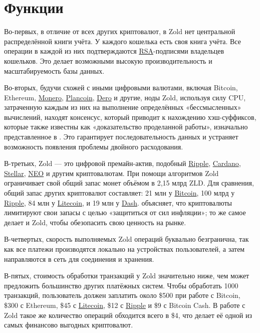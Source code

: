 \documentclass[12pt,oneside]{article}
\begin{document}
\pagebreak

\section*{Функции}

Во-первых, в отличие от всех других криптовалют, в Zold нет центральной
распределённой книги учёта. У каждого кошелька есть своя книга учёта. Все
операции в каждой из них подтверждаются
\href{https://ru.wikipedia.org/wiki/RSA}{RSA}-подписями владельцев кошельков. Это
делает возможными высокую производительность и масштабируемость базы данных.

Во-вторых, будучи схожей с иными цифровыми валютами, включая Bitcoin, Ethereum,
\href{https://getmonero.org/}{Monero}, \href{https://plancoin.co/}{Plancoin},
\href{https://dero.io/}{Dero} и другие, ноды Zold, используя силу CPU, затраченную
каждым из них на выполнение определённых «бессмысленных» вычислений,
находят консенсус, который приводит к нахождению хэш-суффиксов, которые также
известны как «доказательство проделанной работы», изначально представленное 
в \citeyear{back1997}. Это гарантирует последовательность данных и устраняет возможность
появления проблемы двойного расходования.

В-третьих, Zold --- это цифровой премайн-актив, подобный \href{https://ripple.com/}{Ripple},
\href{https://www.cardano.org/en/home/}{Cardano},
\href{https://www.stellar.org/}{Stellar},
\href{https://neo.org/}{NEO} и другим криптовалютам. При помощи алгоритмов Zold ограничивает свой общий
запас монет объёмом в 2,15 млрд ZLD. Для сравнения, общий запас других
криптовалют составляет:
21 млн у \href{https://bitcoin.org/}{Bitcoin},
100 млрд у \href{https://ripple.com/}{Ripple},
84 млн у \href{https://litecoin.org/}{Litecoin},
и
19 млн у \href{https://www.dash.org/}{Dash}.
 объясняет, что криптовалюты лимитируют свои запасы с
целью «защититься от сил инфляции»; то же самое делает и Zold, чтобы обезопасить
свою ценность на рынке.

В-четвертых, скорость выполняемых Zold операций буквально безгранична, так как
все платежи производятся локально на устройствах пользователей, а затем
направляются в сеть для соединения и хранения.

В-пятых, стоимость обработки транзакций у Zold значительно ниже, чем может
предложить большинство других платёжных систем. Чтобы обработать 1000
транзакций, пользователь должен заплатить около \$500 при работе с Bitcoin, \$300
с Ethereum, \$45 с \href{https://litecoin.org/}{Litecoin}, \$12 с \href{https://ripple.com/}{Ripple}
и \$9 с Bitcoin Cash. В работе с Zold
такое же количество операций обходится всего в \$4, что делает её одной из самых
финансово выгодных криптовалют.
\end{document}
